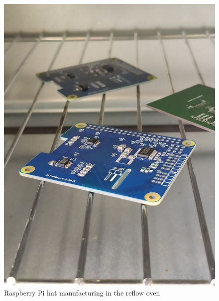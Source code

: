 \begin{figure}[H]
	\centering
	\includegraphics[scale=0.2]{../art/pcb Manufactureing.jpeg}
	\caption{Raspberry Pi hat manufacturing in the reflow oven}
\end{figure}
